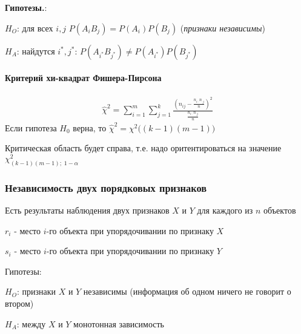 \documentclass[12pt]{extarticle}
\begin{document}
\par\textbf{Гипотезы.}:
\begin{description}
    \item $H_{O}$: для всех $i,j$ $P(A_{i}B_{j})=P(A_{i})P(B_{j})$
        (\textit{признаки независимы})
    \item $H_{A}$: найдутся
        $i^{*},j^{*}:\,P(A_{i^{*}}B_{j^{*}})\neq
        P(A_{i^{*}})P(B_{j^{*}})$
\end{description}

\paragraph{Критерий хи-квадрат Фишера-Пирсона}
\begin{eqnarray*}
    \hat{\chi}^{2}
    =\sum\limits_{i=1}^{m}\sum\limits_{j=1}^{k}
    \frac{\left(n_{ij}-\frac{n_{i\cdot}n_{\cdot j}}{n}\right)^{2}}
    {\frac{n_{i\cdot}n_{\cdot j}}{n}}
\end{eqnarray*}
Если гипотеза $H_{0}$ верна, то
$\hat{\chi}^{2}=\chi^{2}\big((k-1)(m-1)\big)$
\par Критическая область будет справа, т.е. надо оритентироваться на
значение $\chi^{2}_{(k-1)(m-1);\;1-\alpha}$

\subsubsection{Независимость двух порядковых признаков}
Есть результаты наблюдения двух признаков $X$ и $Y$ для каждого из $n$
объектов
\begin{description}
    \item $r_{i}$ - место $i$-го объекта при упорядочивании по признаку
        $X$
    \item $s_{i}$ - место $i$-го объекта при упорядочивании по признаку
        $Y$
\end{description}
Гипотезы:
\begin{description}
    \item $H_{O}$: признаки $X$ и $Y$ независимы (информация об одном
        ничего не говорит о втором)
    \item $H_{A}$: между $X$ и $Y$ монотонная зависимость
\end{description}
\end{document}
